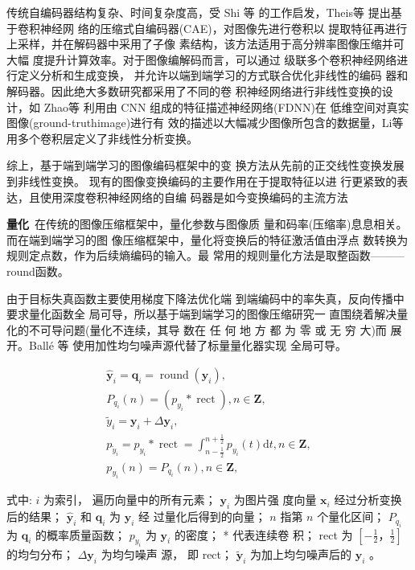 传统自编码器结构复杂、时间复杂度高，受 Shi 等 \cite{shi2016real}的工作启发，Theis等 \cite{theis2017lossy}提出基于卷积神经网 络的压缩式自编码器(CAE)，对图像先进行卷积以 提取特征再进行上采样，并在解码器中采用了子像 素结构，该方法适用于高分辨率图像压缩并可大幅 度提升计算效率。对于图像编解码而言，可以通过 级联多个卷积神经网络进行定义分析和生成变换， 并允许以端到端学习的方式联合优化非线性的编码 器和解码器。因此绝大多数研究都采用了不同的卷 积神经网络进行非线性变换的设计，如 Zhao等 \cite{zhao2019learning} 利用由 CNN 组成的特征描述神经网络(FDNN)在 低维空间对真实图像(ground-truthimage)进行有 效的描述以大幅减少图像所包含的数据量，Li等 \cite{li2018learning} 用多个卷积层定义了非线性分析变换。 

综上，基于端到端学习的图像编码框架中的变 换方法从先前的正交线性变换发展到非线性变换。 现有的图像变换编码的主要作用在于提取特征以进 行更紧致的表达，且使用深度卷积神经网络的自编 码器是如今变换编码的主流方法

\noindent\textbf{量化}~在传统的图像压缩框架中，量化参数与图像质 量和码率(压缩率)息息相关。而在端到端学习的图 像压缩框架中，量化将变换后的特征激活值由浮点 数转换为规则定点数，作为后续熵编码的输入。最 常用的规则量化方法是取整函数———round函数。

由于目标失真函数主要使用梯度下降法优化端 到端编码中的率失真，反向传播中要求量化函数全 局可导，所以基于端到端学习的图像压缩研究一 直围绕着解决量化的不可导问题(量化不连续，其导 数在 任 何 地 方 都 为 零 或 无 穷 大)而 展 开。Ballé 等 \cite{balle2016end, DBLP:conf/pcs/BalleLS16}使用加性均匀噪声源代替了标量量化器实现 全局可导。

\begin{equation}
\begin{gathered}
\hat{\boldsymbol{y}}_i=\boldsymbol{q}_i=\operatorname{round}\left(\boldsymbol{y}_i\right), \\
P_{q_i}(n)=\left(p_{y_i} * \operatorname{rect}\right), n \in \mathbf{Z},\\
\widetilde{y}_i=\boldsymbol{y}_i+\Delta \boldsymbol{y}_i, \\
p_{\widetilde{y}_i}=p_{y_i} * \operatorname{rect}=\int_{n-\frac{1}{2}}^{n+\frac{1}{2}} p_{y_i}(t) \mathrm{d} t, n \in \mathbf{Z}, \\
p_{y_i}(n)=P_{q_i}(n), n \in \mathbf{Z},
\end{gathered}
\end{equation}

式中: $i$ 为索引， 遍历向量中的所有元素； $\boldsymbol{y}_i$ 为图片强 度向量 $\boldsymbol{x}_i$ 经过分析变换后的结果； $\hat{\boldsymbol{y}}_i$ 和 $\boldsymbol{q}_i$ 为 $\boldsymbol{y}_i$ 经 过量化后得到的向量； $n$ 指第 $n$ 个量化区间； $P_{q_i}$ 为 $\boldsymbol{q}_i$ 的概率质量函数； $p_{y_i}$ 为 $\boldsymbol{y}_i$ 的密度； * 代表连续卷 积； rect 为 $\left[-\frac{1}{2}， \frac{1}{2}\right]$ 的均匀分布； $\Delta \boldsymbol{y}_i$ 为均匀噪声 源， 即 rect； $\tilde{\boldsymbol{y}}_i$ 为加上均匀噪声后的 $\boldsymbol{y}_i$ 。


